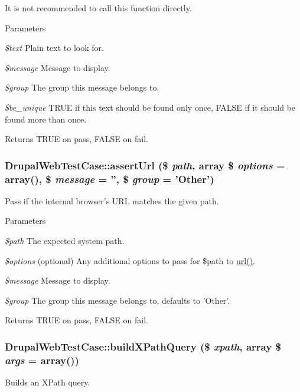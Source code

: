 It is not recommended to call this function directly.


\begin{DoxyParams}{Parameters}
\item[{\em \$text}]Plain text to look for. \item[{\em \$message}]Message to display. \item[{\em \$group}]The group this message belongs to. \item[{\em \$be\_\-unique}]TRUE if this text should be found only once, FALSE if it should be found more than once. \end{DoxyParams}
\begin{DoxyReturn}{Returns}
TRUE on pass, FALSE on fail. 
\end{DoxyReturn}
\hypertarget{classDrupalWebTestCase_af3092e3c713ffab340de6d9e4e8cdcba}{
\subsubsection[{assertUrl}]{\setlength{\rightskip}{0pt plus 5cm}DrupalWebTestCase::assertUrl (\$ {\em path}, \/  array \$ {\em options} = {\ttfamily array()}, \/  \$ {\em message} = {\ttfamily ''}, \/  \$ {\em group} = {\ttfamily 'Other'})}}
\label{classDrupalWebTestCase_af3092e3c713ffab340de6d9e4e8cdcba}
Pass if the internal browser's URL matches the given path.


\begin{DoxyParams}{Parameters}
\item[{\em \$path}]The expected system path. \item[{\em \$options}](optional) Any additional options to pass for \$path to \hyperlink{common_8inc_a43b2a0594431556db49df980801d8807}{url()}. \item[{\em \$message}]Message to display. \item[{\em \$group}]The group this message belongs to, defaults to 'Other'.\end{DoxyParams}
\begin{DoxyReturn}{Returns}
TRUE on pass, FALSE on fail. 
\end{DoxyReturn}
\hypertarget{classDrupalWebTestCase_a97a3a1af39934d2f3d04dcba5967f90c}{
\subsubsection[{buildXPathQuery}]{\setlength{\rightskip}{0pt plus 5cm}DrupalWebTestCase::buildXPathQuery (\$ {\em xpath}, \/  array \$ {\em args} = {\ttfamily array()})}}
\label{classDrupalWebTestCase_a97a3a1af39934d2f3d04dcba5967f90c}
Builds an XPath query.

